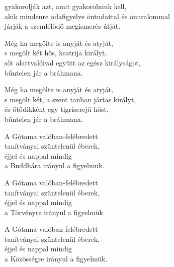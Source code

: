 \begin{dhpverse}

gyakorolják azt, amit gyakorolniuk kell,\\
akik mindenre odafigyelve öntudattal és önuralommal\\
járják a szemlélődő megismerés útját.

 Még ha megölte is anyját és atyját,\\
s megölt két hős, ksatrija királyt,\\
sőt alattvalóival együtt az egész királyságot,\\
bűntelen jár a bráhmana.

 Még ha megölte is anyját és atyját,\\
s megölt két, a szent tanban jártas királyt,\\
és ötödikként egy tigriserejű hőst,\\
bűntelen jár a bráhmana.

 A Gótama valóban-felébredett\\
tanítványai szüntelenül éberek,\\
éjjel és nappal mindig\\
a Buddhára irányul a figyelmük.

 A Gótama valóban-felébredett\\
tanítványai szüntelenül éberek,\\
éjjel és nappal mindig\\
a Törvényre irányul a figyelmük.

 A Gótama valóban-felébredett\\
tanítványai szüntelenül éberek,\\
éjjel és nappal mindig\\
a Közösségre irányul a figyelmük.

\end{dhpverse}
\newpage

